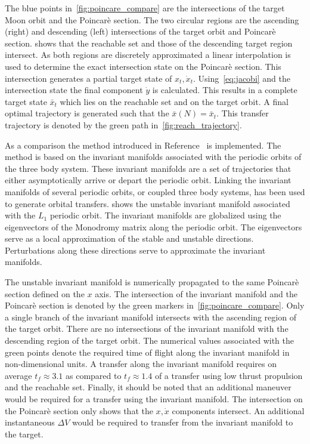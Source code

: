 \documentclass[letterpaper, preprint, paper,11pt]{AAS}	%
\begin{document}
The blue points in~\cref{fig:poincare_compare} are the intersections of the target Moon orbit and the Poincar\`e section.
The two circular regions are the ascending (right) and descending (left) intersections of the target orbit and Poincar\`e section.
 shows that the reachable set and those of the descending target region intersect.
As both regions are discretely approximated a linear interpolation is used to determine the exact intersection state on the Poincar\`e section.
This intersection generates a partial target state of \( x_t , \dot{x}_t \).
Using~\cref{eq:jacobi} and the intersection state the final component \( \dot{y} \) is calculated. 
This results in a complete target state \( \bar{x}_t \) which lies on the reachable set and on the target orbit. 
A final optimal trajectory is generated such that the \( \bar{x}(N) = \bar{x}_t \).
This transfer trajectory is denoted by the green path in~\cref{fig:reach_trajectory}.

As a comparison the method introduced in Reference~ is implemented.
The method is based on the invariant manifolds associated with the periodic orbits of the three body system.
These invariant manifolds are a set of trajectories that either asymptotically arrive or depart the periodic orbit. 
Linking the invariant manifolds of several periodic orbits, or coupled three body systems, has been used to generate orbital transfers.
 shows the unstable invariant manifold associated with the \( L_1\) periodic orbit. 
The invariant manifolds are globalized using the eigenvectors of the Monodromy matrix along the periodic orbit.
The eigenvectors serve as a local approximation of the stable and unstable directions. 
Perturbations along these directions serve to approximate the invariant manifolds.

The unstable invariant manifold is numerically propagated to the same Poincar\`e section defined on the \( x \) axis.
The intersection of the invariant manifold and the Poincar\`e section is denoted by the green markers in~\cref{fig:poincare_compare}.
Only a single branch of the invariant manifold intersects with the ascending region of the target orbit.
There are no intersections of the invariant manifold with the descending region of the target orbit.
The numerical values associated with the green points denote the required time of flight along the invariant manifold in non-dimensional units.
A transfer along the invariant manifold requires on average \( t_f \approx 3.1 \) as compared to \( t_f \approx 1.4 \) of a transfer using low thrust propulsion and the reachable set.
Finally, it should be noted that an additional maneuver would be required for a transfer using the invariant manifold.
The intersection on the Poincar\`e section only shows that the \( x , \dot{x} \) components intersect.
An additional instantaneous \( \Delta V \) would be required to transfer from the invariant manifold to the target.
\end{document}
